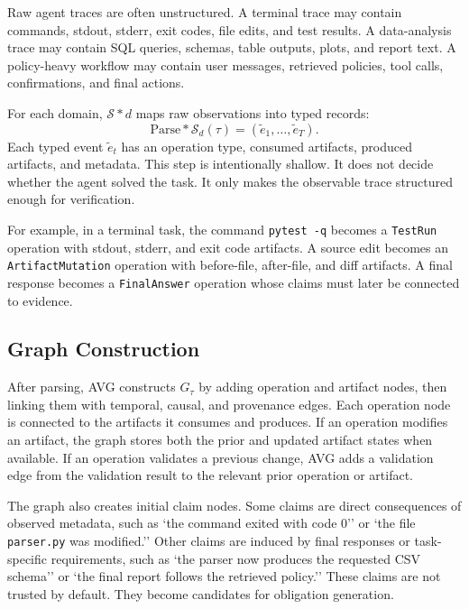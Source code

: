 \documentclass{article} %
\newcommand{\AVG}{\textsc{AVG}\xspace}
\begin{document}
Raw agent traces are often unstructured. A terminal trace may contain commands, stdout, stderr, exit codes, file edits, and test results. A data-analysis trace may contain SQL queries, schemas, table outputs, plots, and report text. A policy-heavy workflow may contain user messages, retrieved policies, tool calls, confirmations, and final actions.

For each domain, $\mathcal{S}*d$ maps raw observations into typed records:
\begin{equation}
\mathrm{Parse}*{\mathcal{S}_d}(\tau) = (\tilde e_1,\ldots,\tilde e_T).
\end{equation}
Each typed event $\tilde e_t$ has an operation type, consumed artifacts, produced artifacts, and metadata. This step is intentionally shallow. It does not decide whether the agent solved the task. It only makes the observable trace structured enough for verification.

For example, in a terminal task, the command \texttt{pytest -q} becomes a \texttt{TestRun} operation with stdout, stderr, and exit code artifacts. A source edit becomes an \texttt{ArtifactMutation} operation with before-file, after-file, and diff artifacts. A final response becomes a \texttt{FinalAnswer} operation whose claims must later be connected to evidence.

\subsection{Graph Construction}

After parsing, \AVG constructs $G_\tau$ by adding operation and artifact nodes, then linking them with temporal, causal, and provenance edges. Each operation node is connected to the artifacts it consumes and produces. If an operation modifies an artifact, the graph stores both the prior and updated artifact states when available. If an operation validates a previous change, \AVG adds a validation edge from the validation result to the relevant prior operation or artifact.

The graph also creates initial claim nodes. Some claims are direct consequences of observed metadata, such as `the command exited with code $0$'' or `the file \texttt{parser.py} was modified.'' Other claims are induced by final responses or task-specific requirements, such as `the parser now produces the requested CSV schema'' or `the final report follows the retrieved policy.'' These claims are not trusted by default. They become candidates for obligation generation.
\end{document}
